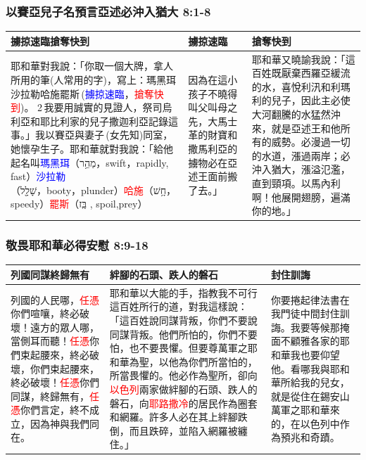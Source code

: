 \subsubsection{以賽亞兒子名預言亞述必沖入猶大 8:1-8}
\begin{table}[H]
\centering 
\begin{tabular}{p{8.5cm}|p{2.25cm}|p{5.75cm}}\hline\hline
擄掠速臨搶奪快到&擄掠速臨&搶奪快到\\\hline
耶和華對我說：「你取一個大牌，拿人所用的筆(人常用的字)，寫上：瑪黑珥沙拉勒哈施罷斯 (\textcolor{blue}{擄掠速臨}，\textcolor{red}{搶奪快到})。 2 我要用誠實的見證人，祭司烏利亞和耶比利家的兒子撒迦利亞記錄這事。」我以賽亞與妻子 (女先知)同室，她懷孕生子。耶和華就對我說：「給他起名叫\textcolor{blue}{瑪黑珥}（מַהֵ֥ר，swift，rapidly, fast）\textcolor{blue}{沙拉勒}（שָׁלָ֖ל，booty，plunder）\textcolor{red}{哈施}（חָ֥שׁ，speedy）\textcolor{red}{罷斯}（בַּֽז , spoil,prey）
&因為在這小孩子不曉得叫父叫母之先，大馬士革的財寶和撒馬利亞的擄物必在亞述王面前搬了去。」
&耶和華又曉諭我說：「這百姓既厭棄西羅亞緩流的水，喜悅利汛和利瑪利的兒子，因此主必使大河翻騰的水猛然沖來，就是亞述王和他所有的威勢。必漫過一切的水道，漲過兩岸；必沖入猶大，漲溢氾濫，直到頸項。以馬內利啊！他展開翅膀，遍滿你的地。」\\\hline
\end{tabular}
\end{table}


\subsubsection{敬畏耶和華必得安慰 8:9-18}
\begin{table}[H]
\centering 
\begin{tabular}{p{4.5cm}|p{8.25cm}|p{4.35cm}}\hline\hline
列國同謀終歸無有&絆腳的石頭、跌人的磐石&封住訓誨\\\hline
列國的人民哪，\textcolor{red}{任憑}你們喧嚷，終必破壞！遠方的眾人哪，當側耳而聽！\textcolor{red}{任憑}你們束起腰來，終必破壞，你們束起腰來，終必破壞！\textcolor{red}{任憑}你們同謀，終歸無有，\textcolor{red}{任憑}你們言定，終不成立，因為神與我們同在。
&耶和華以大能的手，指教我不可行這百姓所行的道，對我這樣說： 「這百姓說同謀背叛，你們不要說同謀背叛。他們所怕的，你們不要怕，也不要畏懼。但要尊萬軍之耶和華為聖，以他為你們所當怕的，所當畏懼的。他必作為聖所，卻向\textcolor{red}{以色列}兩家做絆腳的石頭、跌人的磐石，向\textcolor{red}{耶路撒冷}的居民作為圈套和網羅。許多人必在其上絆腳跌倒，而且跌碎，並陷入網羅被纏住。」
&你要捲起律法書在我門徒中間封住訓誨。我要等候那掩面不顧雅各家的耶和華我也要仰望他。看哪我與耶和華所給我的兒女，就是從住在錫安山萬軍之耶和華來的，在以色列中作為預兆和奇蹟。\\\hline
\end{tabular}
\end{table}


